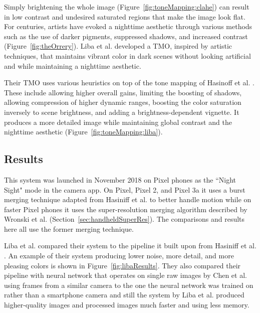 \documentclass{sig-alternate}
\begin{document}
Simply brightening the whole image (Figure~\ref{fig:toneMapping:clahe}) can result in low contrast and undesired saturated regions that make the image look flat. For centuries, artists have evoked a nighttime aesthetic through various methods such as the use of darker pigments, suppressed shadows, and increased contrast (Figure~\ref{fig:theOrrery}).
Liba et al. developed a TMO, inspired by artistic techniques, that maintains vibrant color in dark scenes without looking artificial and while maintaining a nighttime aesthetic. 

Their TMO uses various heuristics on top of the tone mapping of Hasinoff et al. \cite{Hasinoff2016}. These include allowing higher overall gains, limiting the boosting of shadows, allowing compression of higher dynamic ranges, boosting the color saturation inversely to scene brightness, and adding a brightness-dependent vignette.
It produces a more detailed image while maintaining global contrast and the nighttime aesthetic (Figure~\ref{fig:toneMapping:liba}).~\cite{Liba2019}





\subsection{Results}



This system was launched in November 2018 on Pixel phones as the ``Night Sight" mode in the camera app. On Pixel, Pixel 2, and Pixel 3a it uses a burst merging technique adapted from Hasiniff et al. \cite{Hasinoff2016} to better handle motion while on faster Pixel phones it uses the super-resolution merging algorithm described by Wronski et al. \cite{Wronski2019} (Section~\ref{sec:handheldSuperRes}). The comparisons and results here all use the former merging technique. \cite{Liba2019}

Liba et al. compared their system to the pipeline it built upon from Hasiniff et al. \cite{Hasinoff2016}. An example of their system producing lower noise, more detail, and more pleasing colors is shown in Figure~\ref{fig:libaResults}. They also compared their pipeline with neural network that operates on single raw images by Chen et al.~\cite{Chen2018} using frames from a similar camera to the one the neural network was trained on rather than a smartphone camera and still the system by Liba et al. produced higher-quality images and processed images much faster and using less memory.~\cite{Liba2019}
\end{document}
